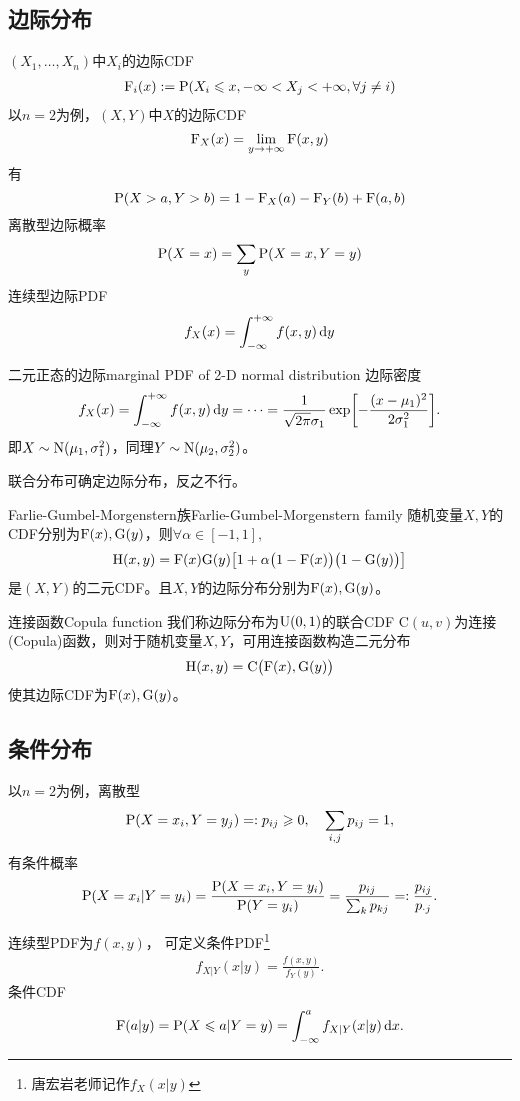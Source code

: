 \subsection{边际分布}
$(X_1,\ldots,X_n)$中$X_i$的边际CDF
\begin{align}
	\CDF_i(x):=\P(X_i\leqslant x,-\infty<X_j<+\infty,\forall j\neq i)
\end{align}
以$n=2$为例，$(X,Y)$中$X$的边际CDF
\[
	\CDF_X(x)=\lim_{y\to+\infty}\CDF(x,y)
\]
有 
\[
	\P(X>a,Y>b)=1-\CDF_X(a)-\CDF_Y(b)+\CDF(a,b)
\]
离散型边际概率
\[
	\P(X=x)=\sum_y\P(X=x,Y=y)
\]
连续型边际PDF
\[
	f_X(x)=\int\iti f(x,y)\d y
\]
\begin{example}{二元正态的边际}{marginal PDF of 2-D normal distribution}
	边际密度
	\[
		f_X(x)=\int\iti f(x,y)\d y=\cdots=\frac1{\sqrt{2\pi}\sigma_1}\exp\biggfkh{-\frac{(x-\mu_1)^2}{2\sigma_1^2}}.
	\]
	即$X\sim\Norm(\mu_1,\sigma_1^2)$，同理$Y\sim\Norm(\mu_2,\sigma_2^2)$。
\end{example}
联合分布可确定边际分布，反之不行。
\begin{example}{Farlie-Gumbel-Morgenstern族}{Farlie-Gumbel-Morgenstern family}
	随机变量$X,Y$的CDF分别为$\CDF(x),\mathrm G(y)$，则$\forall\alpha\in[-1,1],$
	\begin{align}
		\mathrm H(x,y)=\CDF(x)\mathrm G(y)\bigfkh{1+\alpha\bigkh{1-\CDF(x)}\bigkh{1-\mathrm G(y)}}
	\end{align}
	是$(X,Y)$的二元CDF。且$X,Y$的边际分布分别为$\CDF(x),\mathrm G(y)$。
\end{example}
\begin{example}{连接函数}{Copula function}
	我们称边际分布为$\Unif(0,1)$的联合CDF $\mathrm C(u,v)$为连接(Copula)函数，则对于随机变量$X,Y$，可用连接函数构造二元分布
	\begin{align}
		\mathrm H(x,y)=\mathrm C\bigkh{\CDF(x),\mathrm G(y)}
	\end{align}
	使其边际CDF为$\CDF(x),\mathrm G(y)$。
\end{example}
\subsection{条件分布}
以$n=2$为例，离散型
\[
	\P(X=x_i,Y=y_j)=:p_{ij}\geqslant 0,\quad\sum_{i,j}p_{ij}=1,
\]
有条件概率
\begin{align}
	\P(X=x_i|Y=y_i)=\frac{\P(X=x_i,Y=y_i)}{\P(Y=y_i)}=\frac{p_{ij}}{\sum_kp_{kj}}=:\frac{p_{ij}}{p_{\cdot j}}.
\end{align}

连续型PDF为$f(x,y)$，
可定义条件PDF\footnote{唐宏岩老师记作$f_X(x|y)$}
\begin{align}
	f_{X|Y}(x|y)=\frac{f(x,y)}{f_Y(y)}.
\end{align}
条件CDF
\[
	\CDF(a|y)=\P(X\leqslant a|Y=y)=\int_{-\infty}^af_{X|Y}(x|y)\d x.
\]%

